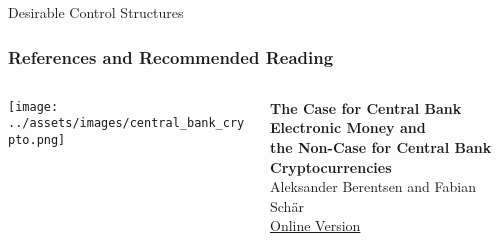 \documentclass[handout]{beamer}
\begin{document}
\begin{frame}{Desirable Control Structures}
	\begin{figure}
		
	\end{figure}
\end{frame}

\begin{frame}%
\frametitle{References and Recommended Reading}

		\begin{columns}[T]
			\begin{column}{0.1\textwidth}
					\texttt{[image: ../assets/images/central\_bank\_crypto.png]}
			\end{column} %
			\begin{column}{0.8\textwidth}
				\textbf{The Case for Central Bank Electronic Money and \\ the Non-Case for Central Bank Cryptocurrencies} \\ 
				Aleksander Berentsen and Fabian Schär \\
				\link \href{https://research.stlouisfed.org/publications/review/2018/02/13/the-case-for-central-bank-electronic-money-and-the-non-case-for-central-bank-cryptocurrencies}{Online Version}
			\end{column}
		\end{columns}
\end{frame}
	
\end{document}
